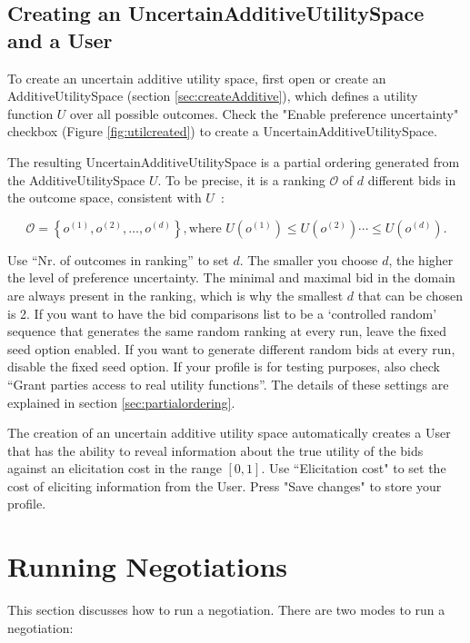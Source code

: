 \documentclass[]{article}
\begin{document}
\subsection{Creating an UncertainAdditiveUtilitySpace and a User}

To create an uncertain additive utility space, first open or create an AdditiveUtilitySpace (section \ref{sec:createAdditive}), which defines a utility function $U$ over all possible outcomes. Check the "Enable preference uncertainty" checkbox  (Figure \ref{fig:utilcreated}) to create a UncertainAdditiveUtilitySpace. 

The resulting UncertainAdditiveUtilitySpace is a partial ordering generated from the AdditiveUtilitySpace $U$. To be precise, it is a ranking $\mathcal{O}$ of $d$ different bids in the outcome space, consistent with $U$~\cite{Tsi18}:

\begin{equation} 
\mathcal{O}=\left\{o^{(1)},o^{(2)}, \dots, o^{(d)} \right\}, \textrm{where } U(o^{(1)}) \leq U(o^{(2)}) \cdots \leq U(o^{(d)}).
\end{equation}


Use ``Nr. of outcomes in ranking'' to set $d$. The smaller you choose $d$, the higher the level of preference uncertainty. The minimal and maximal bid in the domain are always present in the ranking, which is why the smallest $d$ that can be chosen is 2. If you want to have the bid comparisons list to be a `controlled random' sequence that generates the same random ranking at every run, leave the fixed seed option enabled. If you want to generate different random bids at every run, disable the fixed seed option. If your profile is for testing purposes, also check ``Grant parties access to real utility functions''. The details of these settings are explained in section \ref{sec:partialordering}. 

The creation of an uncertain additive utility space automatically creates a User that has the ability to reveal information about the true utility of the bids against an elicitation cost in the range $[0,1]$. Use ``Elicitation cost" to set the cost of eliciting information from the User. Press "Save changes" to store your profile.

\section{Running Negotiations}
This section discusses how to run a negotiation. There are two modes to run a negotiation:
\end{document}
